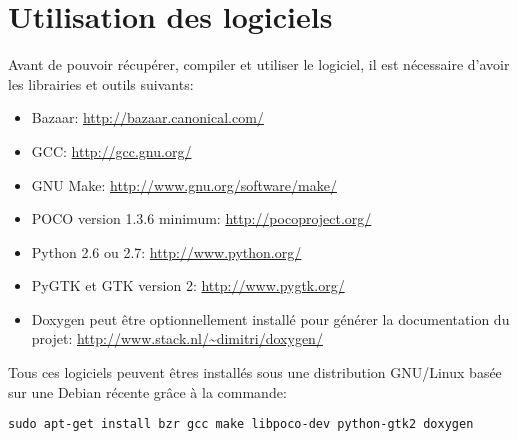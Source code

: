 \section{Utilisation des logiciels}
Avant de pouvoir récupérer, compiler et utiliser le logiciel, il est nécessaire
d'avoir les librairies et outils suivants:
\begin{itemize}
\item Bazaar: \url{http://bazaar.canonical.com/}
\item GCC: \url{http://gcc.gnu.org/}
\item GNU Make: \url{http://www.gnu.org/software/make/}
\item POCO version 1.3.6 minimum: \url{http://pocoproject.org/}
\item Python 2.6 ou 2.7: \url{http://www.python.org/}
\item PyGTK et GTK version 2: \url{http://www.pygtk.org/}
\item Doxygen peut être optionnellement installé pour générer la documentation
  du projet: \url{http://www.stack.nl/~dimitri/doxygen/}
\end{itemize}

Tous ces logiciels peuvent êtres installés sous une distribution GNU/Linux
basée sur une Debian récente grâce à la commande:
\begin{verbatim}
sudo apt-get install bzr gcc make libpoco-dev python-gtk2 doxygen
\end{verbatim}


